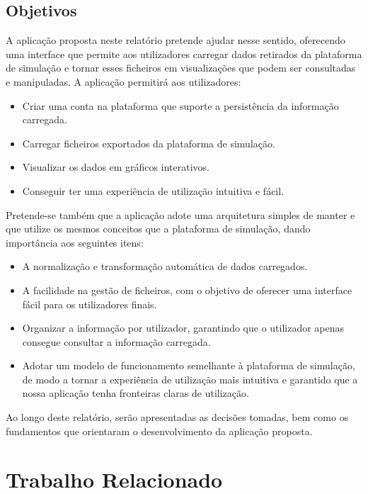 \section{Objetivos}

A aplicação proposta neste relatório pretende ajudar nesse sentido, oferecendo uma interface que permite aos utilizadores carregar dados retirados da plataforma de simulação e tornar esses ficheiros em visualizações que podem ser consultadas e manipuladas. A aplicação permitirá aos utilizadores:

\begin{itemize}
    \item Criar uma conta na plataforma que suporte a persistência da informação carregada.
    \item Carregar ficheiros exportados da plataforma de simulação.
    \item Visualizar os dados em gráficos interativos.
    \item Conseguir ter uma experiência de utilização intuitiva e fácil.
\end{itemize}

Pretende-se também que a aplicação adote uma arquitetura simples de manter e que utilize os mesmos conceitos que a plataforma de simulação, dando importância aos seguintes itens:

\begin{itemize}
    \item A normalização e transformação automática de dados carregados.
    \item A facilidade na gestão de ficheiros, com o objetivo de oferecer uma interface fácil para os utilizadores finais.
    \item Organizar a informação por utilizador, garantindo que o utilizador apenas consegue consultar a informação carregada.
    \item Adotar um modelo de funcionamento semelhante à plataforma de simulação, de modo a tornar a experiência de utilização mais intuitiva e garantido que a nossa aplicação tenha fronteiras claras de utilização.
\end{itemize}

Ao longo deste relatório, serão apresentadas as decisões tomadas, bem como os fundamentos que orientaram o desenvolvimento da aplicação proposta.

\chapter{Trabalho Relacionado}
\label{ch:trabalhoRelacionado}

